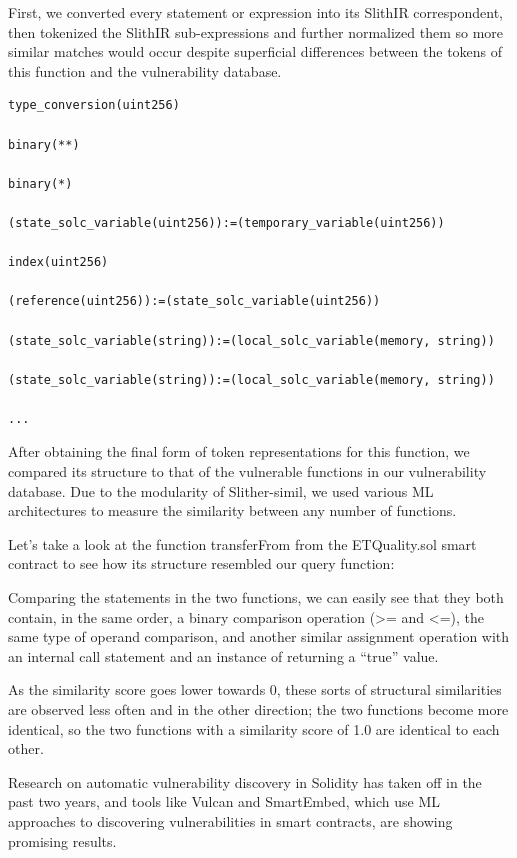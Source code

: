 First, we converted every statement or expression into its SlithIR correspondent, then tokenized the SlithIR sub-expressions and further normalized them so more similar matches would occur
despite superficial differences between the tokens of this function and the vulnerability database.

\begin{lstlisting}[float,caption= Normalized SlithIR tokens of the previous expressions., escapechar=\%, language=Solidity, label=lst:solidity-bug]
type_conversion(uint256)
 
binary(**)
 
binary(*)
 
(state_solc_variable(uint256)):=(temporary_variable(uint256))
 
index(uint256)
 
(reference(uint256)):=(state_solc_variable(uint256))
 
(state_solc_variable(string)):=(local_solc_variable(memory, string))
 
(state_solc_variable(string)):=(local_solc_variable(memory, string))
 
...
  \end{lstlisting}

After obtaining the final form of token representations for this function, we compared its structure to that of the vulnerable functions in our vulnerability database.
Due to the modularity of Slither-simil, we used various ML architectures to measure the similarity between any number of functions.

Let's take a look at the function transferFrom from the ETQuality.sol smart contract to see how its structure resembled our query function:

Comparing the statements in the two functions, we can easily see that they both contain, in the same order, a binary comparison operation (>= and <=), the same type of operand comparison,
and another similar assignment operation with an internal call statement and an instance of returning a “true” value.

As the similarity score goes lower towards 0, these sorts of structural similarities are observed less often and in the other direction; the two functions become more identical, so the two
functions with a similarity score of 1.0 are identical to each other.

Research on automatic vulnerability discovery in Solidity has taken off in the past two years, and tools like Vulcan and SmartEmbed, which use ML approaches to discovering vulnerabilities in
smart contracts, are showing promising results.

